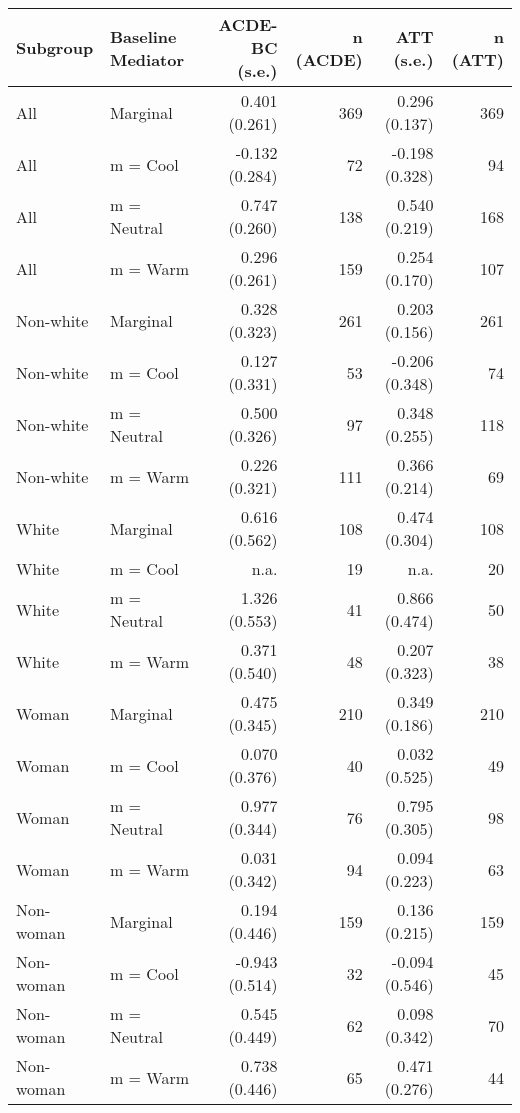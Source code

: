 \begingroup
\fontsize{12.0pt}{14.4pt}\selectfont
\begin{longtable}{llrrrr}
\toprule
Subgroup & Baseline Mediator & ACDE-BC (s.e.) & n (ACDE) & ATT (s.e.) & n (ATT) \\ 
\midrule\addlinespace[2.5pt]
All & Marginal & 0.401 (0.261) & 369 & 0.296 (0.137) & 369 \\ 
All & m = Cool & -0.132 (0.284) & 72 & -0.198 (0.328) & 94 \\ 
All & m = Neutral & 0.747 (0.260) & 138 & 0.540 (0.219) & 168 \\ 
All & m = Warm & 0.296 (0.261) & 159 & 0.254 (0.170) & 107 \\ 
Non-white & Marginal & 0.328 (0.323) & 261 & 0.203 (0.156) & 261 \\ 
Non-white & m = Cool & 0.127 (0.331) & 53 & -0.206 (0.348) & 74 \\ 
Non-white & m = Neutral & 0.500 (0.326) & 97 & 0.348 (0.255) & 118 \\ 
Non-white & m = Warm & 0.226 (0.321) & 111 & 0.366 (0.214) & 69 \\ 
White & Marginal & 0.616 (0.562) & 108 & 0.474 (0.304) & 108 \\ 
White & m = Cool & n.a. & 19 & n.a. & 20 \\ 
White & m = Neutral & 1.326 (0.553) & 41 & 0.866 (0.474) & 50 \\ 
White & m = Warm & 0.371 (0.540) & 48 & 0.207 (0.323) & 38 \\ 
Woman & Marginal & 0.475 (0.345) & 210 & 0.349 (0.186) & 210 \\ 
Woman & m = Cool & 0.070 (0.376) & 40 & 0.032 (0.525) & 49 \\ 
Woman & m = Neutral & 0.977 (0.344) & 76 & 0.795 (0.305) & 98 \\ 
Woman & m = Warm & 0.031 (0.342) & 94 & 0.094 (0.223) & 63 \\ 
Non-woman & Marginal & 0.194 (0.446) & 159 & 0.136 (0.215) & 159 \\ 
Non-woman & m = Cool & -0.943 (0.514) & 32 & -0.094 (0.546) & 45 \\ 
Non-woman & m = Neutral & 0.545 (0.449) & 62 & 0.098 (0.342) & 70 \\ 
Non-woman & m = Warm & 0.738 (0.446) & 65 & 0.471 (0.276) & 44 \\ 
\bottomrule
\end{longtable}
\endgroup


